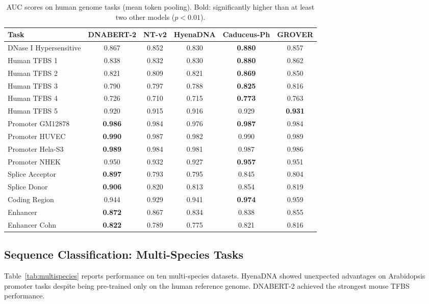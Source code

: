 \documentclass[11pt]{article}
\begin{document}
\begin{table}[ht]
\centering
\caption{AUC scores on human genome tasks (mean token pooling). Bold: significantly higher than at least two other models ($p < 0.01$).}
\label{tab:human}
\begin{adjustbox}{max width=\textwidth}
\begin{tabular}{@{}lccccc@{}}
\toprule
Task & DNABERT-2 & NT-v2 & HyenaDNA & Caduceus-Ph & GROVER \\
\midrule
DNase I Hypersensitive & 0.867 & 0.852 & 0.830 & \textbf{0.880} & 0.857 \\
Human TFBS 1 & 0.838 & 0.832 & 0.830 & \textbf{0.880} & 0.862 \\
Human TFBS 2 & 0.821 & 0.809 & 0.821 & \textbf{0.869} & 0.850 \\
Human TFBS 3 & 0.790 & 0.797 & 0.788 & \textbf{0.825} & 0.816 \\
Human TFBS 4 & 0.726 & 0.710 & 0.715 & \textbf{0.773} & 0.763 \\
Human TFBS 5 & 0.920 & 0.915 & 0.916 & 0.929 & \textbf{0.931} \\
Promoter GM12878 & \textbf{0.986} & 0.984 & 0.976 & \textbf{0.987} & 0.984 \\
Promoter HUVEC & \textbf{0.990} & 0.987 & 0.982 & 0.990 & 0.989 \\
Promoter Hela-S3 & \textbf{0.989} & 0.984 & 0.981 & 0.987 & 0.986 \\
Promoter NHEK & 0.950 & 0.932 & 0.927 & \textbf{0.957} & 0.951 \\
Splice Acceptor & \textbf{0.897} & 0.793 & 0.795 & 0.845 & 0.804 \\
Splice Donor & \textbf{0.906} & 0.820 & 0.813 & 0.854 & 0.819 \\
Coding Region & 0.944 & 0.929 & 0.941 & \textbf{0.974} & 0.959 \\
Enhancer & \textbf{0.872} & 0.867 & 0.834 & 0.838 & 0.855 \\
Enhancer Cohn & \textbf{0.822} & 0.789 & 0.775 & 0.821 & 0.816 \\
\bottomrule
\end{tabular}
\end{adjustbox}
\end{table}

\subsection{Sequence Classification: Multi-Species Tasks}

Table~\ref{tab:multispecies} reports performance on ten multi-species datasets.  HyenaDNA showed unexpected advantages on Arabidopsis promoter tasks despite being pre-trained only on the human reference genome.  DNABERT-2 achieved the strongest mouse TFBS performance.
\end{document}
